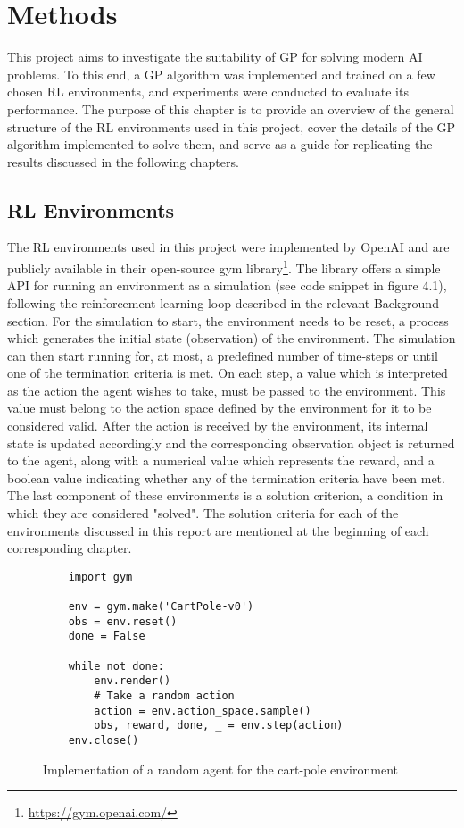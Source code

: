 \chapter{Methods}
This project aims to investigate the suitability of GP for solving modern AI problems. To this end, a GP algorithm was implemented and trained on a few chosen RL environments, and experiments were conducted to evaluate its performance. The purpose of this chapter is to provide an overview of the general structure of the RL environments used in this project, cover the details of the GP algorithm implemented to solve them, and serve as a guide for replicating the results discussed in the following chapters.


\section{RL Environments}
The RL environments used in this project were implemented by OpenAI and are publicly available in their open-source gym library\footnote{\url{https://gym.openai.com/}}. The library offers a simple API for running an environment as a simulation (see code snippet in figure 4.1), following the reinforcement learning loop described in the relevant Background section. For the simulation to start, the environment needs to be reset, a process which generates the initial state (observation) of the environment. The simulation can then start running for, at most, a predefined number of time-steps or until one of the termination criteria is met. On each step, a value which is interpreted as the action the agent wishes to take, must be passed to the environment. This value must belong to the action space defined by the environment for it to be considered valid. After the action is received by the environment, its internal state is updated accordingly and the corresponding observation object is returned to the agent, along with a numerical value which represents the reward, and a boolean value indicating whether any of the termination criteria have been met. The last component of these environments is a solution criterion, a condition in which they are considered "solved". The solution criteria for each of the environments discussed in this report are mentioned at the beginning of each corresponding chapter.

\begin{figure}[ht]
    \centering
    \begin{verbatim}
    import gym
    
    env = gym.make('CartPole-v0')
    obs = env.reset()
    done = False
    
    while not done:
        env.render()
        # Take a random action
        action = env.action_space.sample()
        obs, reward, done, _ = env.step(action)
    env.close()
    \end{verbatim}
    \caption{Implementation of a random agent for the cart-pole environment}
    \label{fig:simple_gym_env}
\end{figure}


